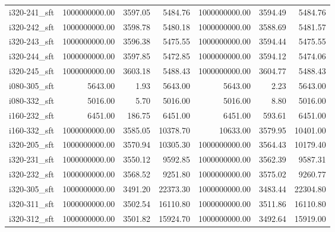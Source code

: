 \begin{tabular}{lrrrrrr}
i320-241\_sft &    1000000000.00 &              3597.05 &        5484.76 &    1000000000.00 &              3594.49 &        5484.76 \\
i320-242\_sft &    1000000000.00 &              3598.78 &        5480.18 &    1000000000.00 &              3588.69 &        5481.57 \\
i320-243\_sft &    1000000000.00 &              3596.38 &        5475.55 &    1000000000.00 &              3594.44 &        5475.55 \\
i320-244\_sft &    1000000000.00 &              3597.85 &        5472.85 &    1000000000.00 &              3594.12 &        5474.06 \\
i320-245\_sft &    1000000000.00 &              3603.18 &        5488.43 &    1000000000.00 &              3604.77 &        5488.43 \\
i080-305\_sft &          5643.00 &                 1.93 &        5643.00 &          5643.00 &                 2.23 &        5643.00 \\
i080-332\_sft &          5016.00 &                 5.70 &        5016.00 &          5016.00 &                 8.80 &        5016.00 \\
i160-232\_sft &          6451.00 &               186.75 &        6451.00 &          6451.00 &               593.61 &        6451.00 \\
i160-332\_sft &    1000000000.00 &              3585.05 &       10378.70 &         10633.00 &              3579.95 &       10401.00 \\
i320-205\_sft &    1000000000.00 &              3570.94 &       10305.30 &    1000000000.00 &              3564.43 &       10179.40 \\
i320-231\_sft &    1000000000.00 &              3550.12 &        9592.85 &    1000000000.00 &              3562.39 &        9587.31 \\
i320-232\_sft &    1000000000.00 &              3568.52 &        9251.80 &    1000000000.00 &              3575.02 &        9260.77 \\
i320-305\_sft &    1000000000.00 &              3491.20 &       22373.30 &    1000000000.00 &              3483.44 &       22304.80 \\
i320-311\_sft &    1000000000.00 &              3502.54 &       16110.80 &    1000000000.00 &              3511.86 &       16110.80 \\
i320-312\_sft &    1000000000.00 &              3501.82 &       15924.70 &    1000000000.00 &              3492.64 &       15919.00 \\

\end{tabular}
